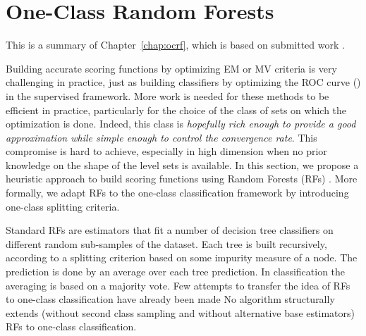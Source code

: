 \section{One-Class Random Forests}
\label{resume:ocrf}
This is a summary of Chapter~\ref{chap:ocrf}, which is based on submitted work \citep{OCRF16}.


Building accurate scoring functions by optimizing EM or MV criteria is very challenging in practice, just as building classifiers by optimizing the ROC curve (\cite{Clemencon2010}) in the supervised framework.
%
More work is needed for these methods to be efficient in practice, particularly for the choice of the class of sets on which the optimization is done.
%
Indeed, %
this class is \emph{hopefully rich enough to provide a good approximation while simple enough to control the convergence rate}. This compromise is hard to achieve, especially in high dimension when no prior knowledge on the shape of the level sets is available. 
%
%
In this section, we propose a heuristic approach to build scoring functions using Random Forests (RFs) \citep{Breiman2001, Genuer2008, Biau2016}. %
More formally, we adapt RFs to the one-class classification framework by introducing one-class splitting criteria.

Standard RFs are estimators that fit a number of decision tree
classifiers on different random sub-samples of the dataset.
Each tree is built recursively, according to a splitting criterion based on
some impurity measure of a node. The prediction is done by an average over each tree prediction. In classification the averaging is based on a majority vote.
Few attempts to transfer the idea of RFs to one-class
classification have already been made \citep{Desir12, Liu2008, Shi2012}
%
No algorithm structurally extends (without second class sampling and without alternative base estimators) RFs to one-class classification.

